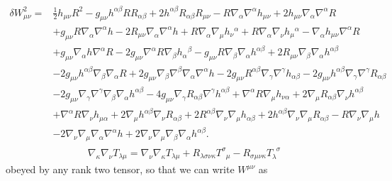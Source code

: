 \documentclass[10pt,letterpaper]{article}
\begin{document}
\begin{align}
\delta W^2_{\mu\nu}={}&\tfrac{1}{2} h_{\mu \nu} R^2
 -  g_{\mu \nu} h^{\alpha \beta} R R_{\alpha \beta}
 + 2 h^{\alpha \beta} R_{\alpha \beta} R_{\mu \nu}
 -  R \nabla_{\alpha}\nabla^{\alpha}h_{\mu \nu}
 + 2 h_{\mu \nu} \nabla_{\alpha}\nabla^{\alpha}R\nonumber\\
& + g_{\mu \nu} R \nabla_{\alpha}\nabla^{\alpha}h
 - 2 R_{\mu \nu} \nabla_{\alpha}\nabla^{\alpha}h
 + R \nabla_{\alpha}\nabla_{\mu}h_{\nu}{}^{\alpha}
 + R \nabla_{\alpha}\nabla_{\nu}h_{\mu}{}^{\alpha}
 -  \nabla_{\alpha}h_{\mu \nu} \nabla^{\alpha}R\nonumber\\
& + g_{\mu \nu} \nabla_{\alpha}h \nabla^{\alpha}R
 - 2 g_{\mu \nu} \nabla^{\alpha}R \nabla_{\beta}h_{\alpha}{}^{\beta}
 -  g_{\mu \nu} R \nabla_{\beta}\nabla_{\alpha}h^{\alpha \beta}
 + 2 R_{\mu \nu} \nabla_{\beta}\nabla_{\alpha}h^{\alpha \beta}\nonumber\\
& - 2 g_{\mu \nu} h^{\alpha \beta} \nabla_{\beta}\nabla_{\alpha}R
 + 2 g_{\mu \nu} \nabla_{\beta}\nabla^{\beta}\nabla_{\alpha}\nabla^{\alpha}h
 - 2 g_{\mu \nu} R^{\alpha \beta} \nabla_{\gamma}\nabla^{\gamma}h_{\alpha \beta}
 - 2 g_{\mu \nu} h^{\alpha \beta} \nabla_{\gamma}\nabla^{\gamma}R_{\alpha \beta}\nonumber\\
& - 2 g_{\mu \nu} \nabla_{\gamma}\nabla^{\gamma}\nabla_{\beta}\nabla_{\alpha}h^{\alpha \beta}
 - 4 g_{\mu \nu} \nabla_{\gamma}R_{\alpha \beta} \nabla^{\gamma}h^{\alpha \beta}
 + \nabla^{\alpha}R \nabla_{\mu}h_{\nu \alpha}
 + 2 \nabla_{\mu}R_{\alpha \beta} \nabla_{\nu}h^{\alpha \beta}\nonumber\\
& + \nabla^{\alpha}R \nabla_{\nu}h_{\mu \alpha}
 + 2 \nabla_{\mu}h^{\alpha \beta} \nabla_{\nu}R_{\alpha \beta}
 + 2 R^{\alpha \beta} \nabla_{\nu}\nabla_{\mu}h_{\alpha \beta}
 + 2 h^{\alpha \beta} \nabla_{\nu}\nabla_{\mu}R_{\alpha \beta}
 -  R \nabla_{\nu}\nabla_{\mu}h\nonumber\\
& - 2 \nabla_{\nu}\nabla_{\mu}\nabla_{\alpha}\nabla^{\alpha}h
 + 2 \nabla_{\nu}\nabla_{\mu}\nabla_{\beta}\nabla_{\alpha}h^{\alpha \beta}.
\end{align}
%
\begin{eqnarray}
\nabla_{\kappa}\nabla_{\nu}T_{\lambda \mu}=\nabla_{\nu}\nabla_{\kappa}T_{\lambda \mu}+R_{\lambda\sigma\nu\kappa}T^{\sigma}_{\phantom{\sigma}\mu}-R_{\sigma\mu\nu\kappa}T_{\lambda}^{\phantom{\lambda}\sigma}
\label{AP41}
\end{eqnarray}
%
obeyed by any rank two tensor, so that we can write $W^{\mu\nu}$ as 
%                                                                               
\end{document}
